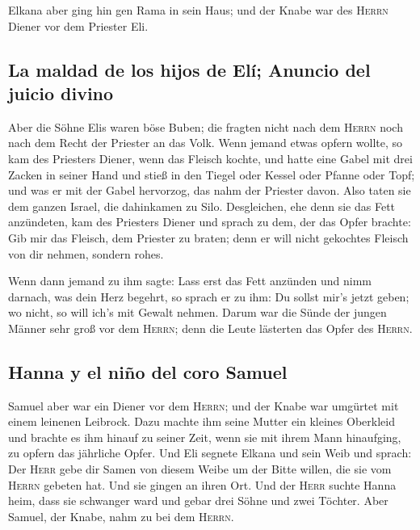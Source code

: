  Elkana aber ging hin gen Rama in sein Haus; und der
Knabe war des \textsc{Herrn} Diener vor dem Priester Eli.

\hypertarget{la-maldad-de-los-hijos-de-eluxed-anuncio-del-juicio-divino}{%
\subsection{La maldad de los hijos de Elí; Anuncio del juicio
divino}\label{la-maldad-de-los-hijos-de-eluxed-anuncio-del-juicio-divino}}

 Aber die Söhne Elis waren böse Buben; die fragten nicht
nach dem \textsc{Herrn}  noch nach dem Recht der Priester
an das Volk. Wenn jemand etwas opfern wollte, so kam des Priesters
Diener, wenn das Fleisch kochte, und hatte eine Gabel mit drei Zacken in
seiner Hand  und stieß in den Tiegel oder Kessel oder
Pfanne oder Topf; und was er mit der Gabel hervorzog, das nahm der
Priester davon. Also taten sie dem ganzen Israel, die dahinkamen zu
Silo.  Desgleichen, ehe denn sie das Fett anzündeten, kam
des Priesters Diener und sprach zu dem, der das Opfer brachte: Gib mir
das Fleisch, dem Priester zu braten; denn er will nicht gekochtes
Fleisch von dir nehmen, sondern rohes.

 Wenn dann jemand zu ihm sagte: Lass erst das Fett
anzünden und nimm darnach, was dein Herz begehrt, so sprach er zu ihm:
Du sollst mir's jetzt geben; wo nicht, so will ich's mit Gewalt nehmen.
 Darum war die Sünde der jungen Männer sehr groß vor dem
\textsc{Herrn}; denn die Leute lästerten das Opfer des \textsc{Herrn}.

\hypertarget{hanna-y-el-niuxf1o-del-coro-samuel}{%
\subsection{Hanna y el niño del coro
Samuel}\label{hanna-y-el-niuxf1o-del-coro-samuel}}

 Samuel aber war ein Diener vor dem \textsc{Herrn}; und
der Knabe war umgürtet mit einem leinenen Leibrock.  Dazu
machte ihm seine Mutter ein kleines Oberkleid und brachte es ihm hinauf
zu seiner Zeit, wenn sie mit ihrem Mann hinaufging, zu opfern das
jährliche Opfer.  Und Eli segnete Elkana und sein Weib
und sprach: Der \textsc{Herr} gebe dir Samen von diesem Weibe um der
Bitte willen, die sie vom \textsc{Herrn} gebeten hat. Und sie gingen an
ihren Ort.  Und der \textsc{Herr} suchte Hanna heim, dass
sie schwanger ward und gebar drei Söhne und zwei Töchter. Aber Samuel,
der Knabe, nahm zu bei dem \textsc{Herrn}.

